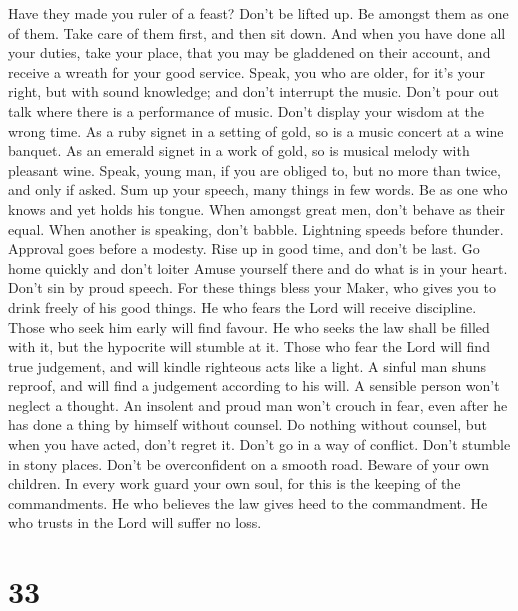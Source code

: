  Have they made you ruler of a feast? Don't be lifted up. Be
amongst them as one of them. Take care of them first, and then sit down.
 And when you have done all your duties, take your place,
that you may be gladdened on their account, and receive a wreath for
your good service.  Speak, you who are older, for it's your
right, but with sound knowledge; and don't interrupt the music.
 Don't pour out talk where there is a performance of music.
Don't display your wisdom at the wrong time.  As a ruby
signet in a setting of gold, so is a music concert at a wine banquet.
 As an emerald signet in a work of gold, so is musical
melody with pleasant wine.  Speak, young man, if you are
obliged to, but no more than twice, and only if asked.  Sum
up your speech, many things in few words. Be as one who knows and yet
holds his tongue.  When amongst great men, don't behave as
their equal. When another is speaking, don't babble. 
Lightning speeds before thunder. Approval goes before a modesty.
 Rise up in good time, and don't be last. Go home quickly
and don't loiter  Amuse yourself there and do what is in
your heart. Don't sin by proud speech.  For these things
bless your Maker, who gives you to drink freely of his good things.
 He who fears the Lord will receive discipline. Those who
seek him early will find favour.  He who seeks the law
shall be filled with it, but the hypocrite will stumble at it.
 Those who fear the Lord will find true judgement, and will
kindle righteous acts like a light.  A sinful man shuns
reproof, and will find a judgement according to his will. 
A sensible person won't neglect a thought. An insolent and proud man
won't crouch in fear, even after he has done a thing by himself without
counsel.  Do nothing without counsel, but when you have
acted, don't regret it.  Don't go in a way of conflict.
Don't stumble in stony places.  Don't be overconfident on a
smooth road.  Beware of your own children.  In
every work guard your own soul, for this is the keeping of the
commandments.  He who believes the law gives heed to the
commandment. He who trusts in the Lord will suffer no loss.

\hypertarget{section-28}{%
\section{33}\label{section-28}}

